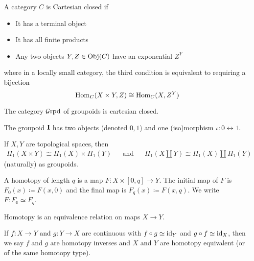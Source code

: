 \documentclass[a5paper]{article}
\begin{document}
\begin{definition*}
  A category $C$ is Cartesian closed if
  \begin{itemize}
    \itemsep0em
    \item It has a terminal object
    \item It has all finite products
    \item Any two objects $Y,Z\in\operatorname{Obj}(C)$ have an exponential $Z^Y$
  \end{itemize}
  where in a locally small category, the third condition is equivalent to
  requiring a bijection
  \begin{equation*}
    \operatorname{Hom}_C(X\times Y, Z)\cong \operatorname{Hom}_C(X,Z^Y)
  \end{equation*}
\end{definition*}


\begin{proposition*}
	The category $\mathcal{G}\mathrm{rpd}$ of groupoids is cartesian closed.
\end{proposition*}


\begin{definition*}
	The groupoid $\mathbf{I}$ has two objects (denoted $0,1$) and one (iso)morphism
  $\iota:0\leftrightarrow 1$.
\end{definition*}


\begin{proposition*}
	If $X,Y$ are topological spaces, then
  \begin{align*}
    \Pi_1(X\times Y)\cong \Pi_1(X)\times\Pi_1(Y)
    &&\text{and}&&
    \Pi_1(X\amalg Y)\cong \Pi_1(X)\amalg\Pi_1(Y)
  \end{align*}
  (naturally) as groupoids.
\end{proposition*}


\begin{definition*}
	A homotopy of length $q$ is a map $F:X\times[0,q]\to Y$. The initial map of
  $F$ is $F_0(x)\coloneqq F(x,0)$ and the final map is $F_q(x)\coloneqq F(x,q)$.
  We write $F:F_0\simeq F_q$.
\end{definition*}


\begin{proposition*}
	Homotopy is an equivalence relation on maps $X\to Y$.
\end{proposition*}


\begin{definition*}
	If $f:X\to Y$ and $g:Y\to X$ are continuous with $f\circ g\simeq \operatorname{id}_Y$ and
  $g\circ f\simeq \operatorname{id}_X$, then we say $f$ and $g$ are homotopy inverses and $X$
  and $Y$ are homotopy equivalent (or of the same homotopy type).
\end{definition*}
\end{document}
